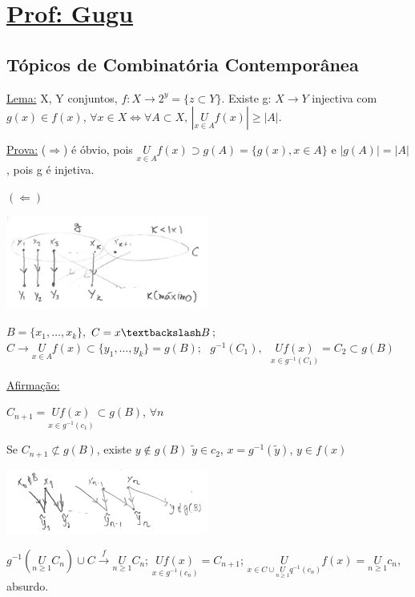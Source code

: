 \documentclass[a4paper,12pt]{article}
\theoremstyle{plain} %
\theoremstyle{definition} %
\theoremstyle{remark} %
\begin{document}
	
	\setlength\parindent{0pt}	
	
	\section*{\underline{Prof: Gugu}}
	\subsection*{T\'opicos de Combinat\'oria Contempor\^anea}
	
	\underline{Lema:} X, Y conjuntos, $f:X\rightarrow 2^y=\{z \subset Y\}$. Existe g: $X\rightarrow Y$ injectiva com $g(x)\in f(x)$, $\forall x\in X \Leftrightarrow \forall A\subset X$, $|\underset{x\in A}{U} f(x)|\geqslant |A|$.
	
	\begin{framed}
		
		\underline{Prova:} ($\Rightarrow$) \'e \'obvio, pois $\underset{x\in A}{U} f(x) \supset g(A)=\{g(x), x\in A\}$ e $|g(A)|=|A|$, pois g \'e injetiva.
		
		$(\Leftarrow)$
		
		\vspace{-1ex}\includegraphics[width=0.5\textwidth]{1 page 1 1.png}
		
		$B=\{x_1,\dots,x_k\}$, $C=x\textbackslash B$; $C\rightarrow \underset{x\in A}{U} f(x)\subset \{y_1,\dots,y_k\}=g(B);\text{ }g^{-1}(C_1),\text{ } \underset{x\in g^{-1}(C_1)}{U f(x)}=C_2\subset g(B)$
		
		\underline{Afirma\c{c}\~ao:}
		
		$C_{n+1}=\underset{x\in g^{-1}(c_1)}{U f(x)} \subset g(B)$, $\forall n$
		
		Se $C_{n+1}\not\subset g(B)$, existe $y\not\in g(B)$ $\tilde y\in c_2$, $x=g^{-1}(\tilde y)$, $y\in f(x)$
		
		\begin{center}
			\includegraphics[width=0.5\textwidth]{1 page 1 2.png}
		\end{center}
		
		$g^{-1}(\underset{n\geqslant 1}{U}C_n)\cup C \xrightarrow{f} \underset{n\geqslant 1}{U}C_n$; $\underset{x\in g^{-1}(c_n)}{U f(x)}=C_{n+1}$; $\underset{x\in C \cup \underset{n\geqslant 1}{U} q^{-1}(c_n)}{U} f(x)=\underset{n\geqslant 1}{U} c_n$, absurdo.
		
		
	\end{framed}
	
\end{document}
